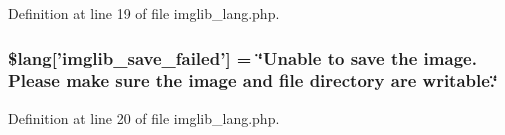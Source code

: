 Definition at line 19 of file imglib\-\_\-lang.\-php.

\subsubsection[{\$lang}]{\setlength{\rightskip}{0pt plus 5cm}\$lang['imglib\-\_\-save\-\_\-failed'] = \char`\"{}Unable {\bf to} save the image. Please make sure the image {\bf and} file directory are writable.\char`\"{}}\label{imglib__lang_8php_a4d7a99fddc60c97a7327fa0125dea264}


Definition at line 20 of file imglib\-\_\-lang.\-php.

